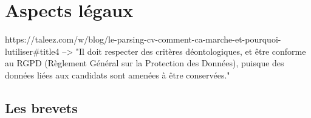 \section{Aspects légaux}\label{section:aspects_legaux}

%
%


https://taleez.com/w/blog/le-parsing-cv-comment-ca-marche-et-pourquoi-lutiliser#title4
--> "Il doit respecter des critères déontologiques, et être conforme au RGPD (Règlement Général sur la Protection des Données), puisque des données liées aux candidats sont amenées à être conservées."

 \subsection{Les brevets}
 
